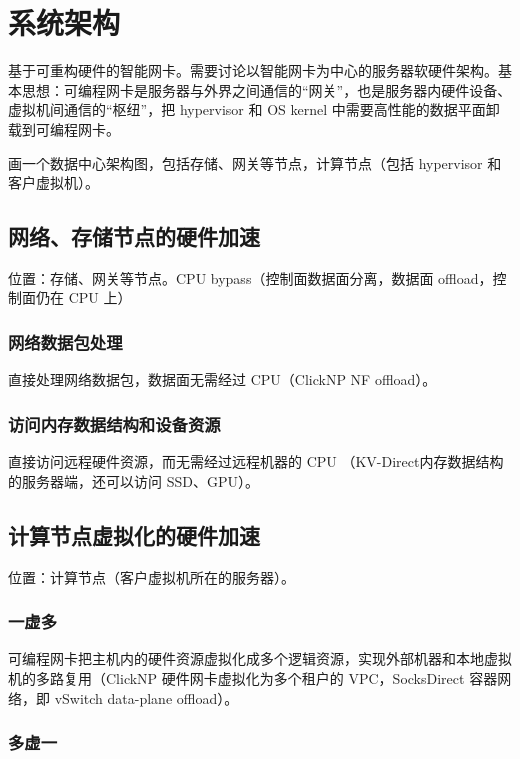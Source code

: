 \chapter{系统架构}

基于可重构硬件的智能网卡。需要讨论以智能网卡为中心的服务器软硬件架构。基本思想：可编程网卡是服务器与外界之间通信的“网关”，也是服务器内硬件设备、虚拟机间通信的“枢纽”，把 hypervisor 和 OS kernel 中需要高性能的数据平面卸载到可编程网卡。

画一个数据中心架构图，包括存储、网关等节点，计算节点（包括 hypervisor 和客户虚拟机）。

\section{网络、存储节点的硬件加速}

位置：存储、网关等节点。CPU bypass（控制面数据面分离，数据面 offload，控制面仍在 CPU 上）

\subsection{网络数据包处理}

直接处理网络数据包，数据面无需经过 CPU（ClickNP NF offload）。

\subsection{访问内存数据结构和设备资源}

直接访问远程硬件资源，而无需经过远程机器的 CPU （KV-Direct内存数据结构的服务器端，还可以访问 SSD、GPU）。

\section{计算节点虚拟化的硬件加速}

位置：计算节点（客户虚拟机所在的服务器）。

\subsection{一虚多}

可编程网卡把主机内的硬件资源虚拟化成多个逻辑资源，实现外部机器和本地虚拟机的多路复用（ClickNP 硬件网卡虚拟化为多个租户的 VPC，SocksDirect 容器网络，即 vSwitch data-plane offload）。

\subsection{多虚一}

